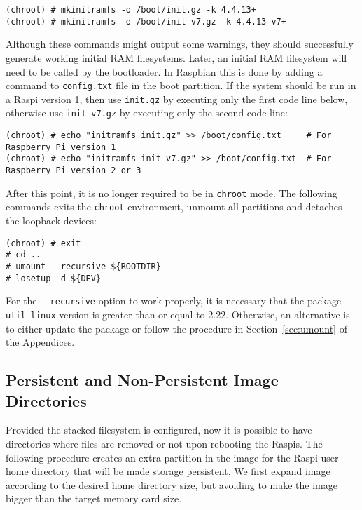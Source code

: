 \begin{lstlisting}[]
(chroot) # mkinitramfs -o /boot/init.gz -k 4.4.13+
(chroot) # mkinitramfs -o /boot/init-v7.gz -k 4.4.13-v7+
\end{lstlisting}
\FloatBarrier
\vspace{-5mm}

Although these commands might output some warnings, they should
successfully generate working initial \ac{RAM} filesystems. Later, an
initial \ac{RAM} filesystem will need to be called by the bootloader.
In Raspbian this is done by adding a command to \texttt{config.txt} file
in the boot partition. If the system should be run in a \ac{Raspi} version 1,
then use \texttt{init.gz} by executing only the first code line below,
otherwise use \texttt{init-v7.gz} by executing only the second code line:

\begin{lstlisting}[]
(chroot) # echo "initramfs init.gz" >> /boot/config.txt     # For Raspberry Pi version 1
(chroot) # echo "initramfs init-v7.gz" >> /boot/config.txt  # For Raspberry Pi version 2 or 3
\end{lstlisting}
\FloatBarrier
\vspace{-5mm}

After this point, it is no longer required to be in \texttt{chroot} mode.
The following commands exits the \texttt{chroot} environment, unmount all
partitions and detaches the loopback devices:

\begin{lstlisting}[]
(chroot) # exit
# cd ..
# umount --recursive ${ROOTDIR}
# losetup -d ${DEV}
\end{lstlisting}
\FloatBarrier
\vspace{-5mm}

For the \texttt{----recursive} option to work properly, it is necessary that
the package \texttt{util-linux} version is greater than or equal to 2.22.
Otherwise, an alternative is to either update the package or follow the
procedure in Section~\ref{sec:umount} of the Appendices.

\subsection{Persistent and Non-Persistent Image Directories}
\label{sec:non_persistent_directories}
Provided the stacked filesystem is configured, now it is possible to have
directories where files are removed or not upon rebooting the \ac{Raspi}s.
The following procedure creates an extra partition in the image for
the \ac{Raspi} user home directory that will be made storage persistent.
We first expand image according to the desired
home directory size, but avoiding to make the image bigger than the target
memory card size.

